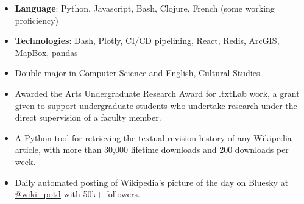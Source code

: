 \begin{itemize}
    \item \textbf{Language}: Python, Javascript, Bash, Clojure, French (some working proficiency)
    \item \textbf{Technologies}: Dash, Plotly, CI/CD pipelining, React, Redis, ArcGIS, MapBox, pandas
\end{itemize}

\begin{itemize}
    \item Double major in Computer Science and English, Cultural Studies.
    \item Awarded the Arts Undergraduate Research Award for .txtLab work, a grant given
          to support undergraduate students who undertake research under the direct
          supervision of a faculty member.
\end{itemize}

\begin{itemize}
    \item A Python tool for retrieving the textual revision history of any Wikipedia
          article, with more than 30,000 lifetime downloads and 200 downloads per week.
\end{itemize}
\begin{itemize}
    \item Daily automated posting of Wikipedia's picture of the day on Bluesky at
          \href{https://bsky.app/profile/wiki-potd.bsky.social}{@wiki\_potd} with 50k+
          followers.
\end{itemize}


